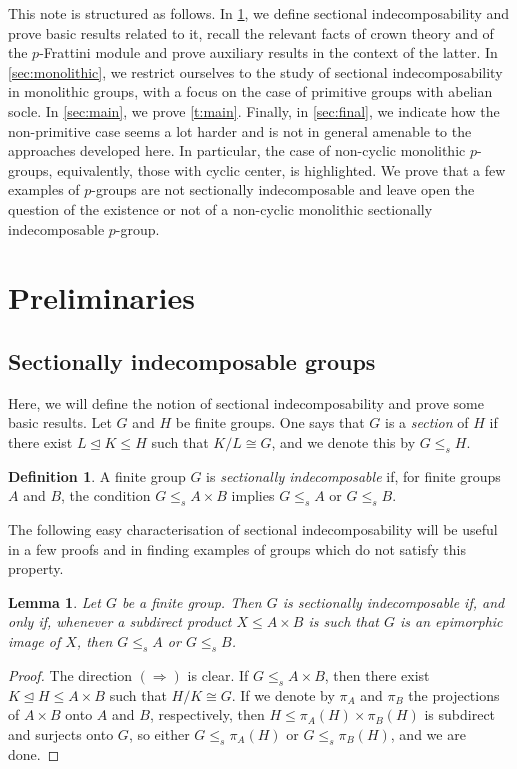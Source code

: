 \documentclass[a4paper,10pt]{amsart}
\theoremstyle{plain}
\newtheorem{lemma}[thm]{Lemma}
\theoremstyle{definition}
\newtheorem{definition}[thm]{Definition}
\begin{document}
This note is structured as follows. In \cref{sec:prelim}, we define sectional indecomposability and prove basic results related to it, recall the relevant facts of crown theory and of the $p$-Frattini module and prove auxiliary results in the context of the latter. In \cref{sec:monolithic}, we restrict ourselves to the study of sectional indecomposability in monolithic groups, with a focus on the case of primitive groups with abelian socle. In \cref{sec:main}, we prove \cref{t:main}. Finally, in \cref{sec:final}, we indicate how the non-primitive case seems a lot harder and is not in general amenable to the approaches developed here. In particular, the case of non-cyclic monolithic $p$-groups, equivalently, those with cyclic center, is highlighted. We prove that a few examples of $p$-groups are not sectionally indecomposable and leave open the question of the existence or not of a non-cyclic monolithic sectionally indecomposable $p$-group.

\section{Preliminaries}\label{sec:prelim}

\subsection{Sectionally indecomposable groups}

Here, we will define the notion of sectional indecomposability and prove some basic results. Let $G$ and $H$ be finite groups. One says that $G$ is a \emph{section} of $H$ if there exist $L \unlhd K \leq H$ such that $K/L \cong G$, and we denote this by $G \leq_s H$. 

\begin{definition}\label{d:strong_indec}
    A finite group $G$ is \emph{sectionally indecomposable} if, for finite groups $A$ and $B$, the condition $G \leq_s A \times B$ implies $G \leq_s A$ or $G \leq_s B$.
\end{definition}

The following easy characterisation of sectional indecomposability will be useful in a few proofs and in finding examples of groups which do not satisfy this property.

\begin{lemma}\label{l:strong_indec_subdirect}
    Let $G$ be a finite group. Then $G$ is sectionally indecomposable if, and only if, whenever a subdirect product $X \leq A \times B$ is such that $G$ is an epimorphic image of $X$, then $G \leq_s A$ or $G \leq_s B$.
\end{lemma}
\begin{proof}
    The direction $(\Rightarrow)$ is clear. If $G \leq_s A \times B$, then there exist $K \unlhd H \leq A \times B$ such that $H/K \cong G$. If we denote by $\pi_A$ and $\pi_B$ the projections of $A \times B$ onto $A$ and $B$, respectively, then $H \leq \pi_A(H) \times \pi_B(H)$ is subdirect and surjects onto $G$, so either $G \leq_s \pi_A(H)$ or $G \leq_s \pi_B(H)$, and we are done.
\end{proof}
\end{document}
